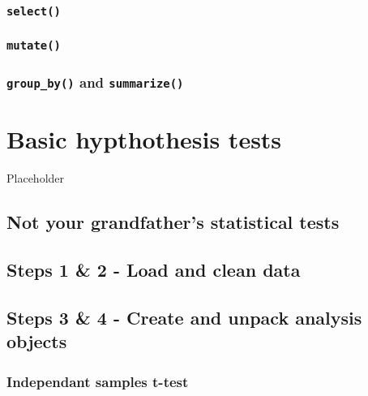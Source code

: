 \documentclass[
]{book}
\begin{document}
\hypertarget{select}{%
\subsection{\texorpdfstring{\texttt{select()}}{select()}}\label{select}}

\hypertarget{mutate}{%
\subsection{\texorpdfstring{\texttt{mutate()}}{mutate()}}\label{mutate}}

\hypertarget{group_by-and-summarize}{%
\subsection{\texorpdfstring{\texttt{group\_by()} and \texttt{summarize()}}{group\_by() and summarize()}}\label{group_by-and-summarize}}

\hypertarget{basic-hypthothesis-tests}{%
\chapter{Basic hypthothesis tests}\label{basic-hypthothesis-tests}}

Placeholder

\hypertarget{not-your-grandfathers-statistical-tests}{%
\section{Not your grandfather's statistical tests}\label{not-your-grandfathers-statistical-tests}}

\hypertarget{steps-1-2---load-and-clean-data}{%
\section{Steps 1 \& 2 - Load and clean data}\label{steps-1-2---load-and-clean-data}}

\hypertarget{steps-3-4---create-and-unpack-analysis-objects}{%
\section{Steps 3 \& 4 - Create and unpack analysis objects}\label{steps-3-4---create-and-unpack-analysis-objects}}

\hypertarget{independant-samples-t-test}{%
\subsection{Independant samples t-test}\label{independant-samples-t-test}}
\end{document}
